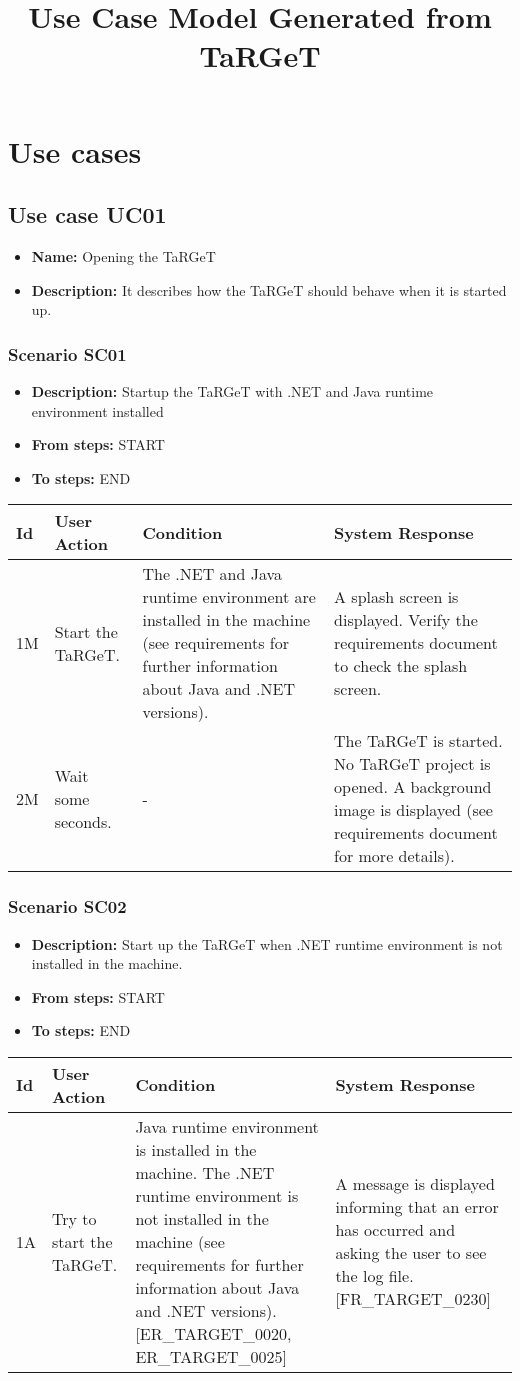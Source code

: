 \documentclass[a4paper,11pt]{article}
\title{Use Case Model Generated from TaRGeT}
\newcommand{\bl}{\\ \hline}
\begin{document}
\maketitle
\section*{Use cases}
\subsection*{Use case UC01}
\begin{itemize}
\item {\bf Name: }Opening the TaRGeT
\item {\bf Description: }It describes how the TaRGeT should behave when it is
				started up.
\end{itemize}
\subsubsection*{Scenario SC01}
\begin{itemize}
\item {\bf Description:} Startup the TaRGeT with .NET and Java runtime
					environment installed
\item {\bf From steps:} START
\item {\bf To steps:} END
\end{itemize}
\begin{tabular}{|p{0.4in}|p{1.5in}|p{1.5in}|p{1.5in}|}
\hline
Id & User Action & Condition & System Response \bl 
1M & 
						Start the TaRGeT.
				 & The .NET and Java runtime environment are installed in
						the machine (see requirements for further information about Java
						and .NET versions). & 
						A splash screen is displayed. Verify the requirements
						document to
						check the splash screen.
				\bl
2M & 
						Wait some seconds.
				 & - & 
						The TaRGeT is started. No TaRGeT project is opened. A
						background image
						is displayed (see requirements document for more
						details).
					\bl
\end{tabular}
\subsubsection*{Scenario SC02}
\begin{itemize}
\item {\bf Description:} Start up the TaRGeT when .NET runtime environment is
					not installed in the machine.
\item {\bf From steps:} START
\item {\bf To steps:} END
\end{itemize}
\begin{tabular}{|p{0.4in}|p{1.5in}|p{1.5in}|p{1.5in}|}
\hline
Id & User Action & Condition & System Response \bl 
1A & Try to start the TaRGeT. & Java runtime environment is installed in the machine.
						The .NET runtime environment is not installed in the machine (see
						requirements for further information about Java and .NET
						versions). [ER_TARGET_0020, ER_TARGET_0025] & A message is displayed informing that an error has
						occurred and asking the user to see the log file. [FR_TARGET_0230]
					\bl
\end{tabular}
\end{document}
